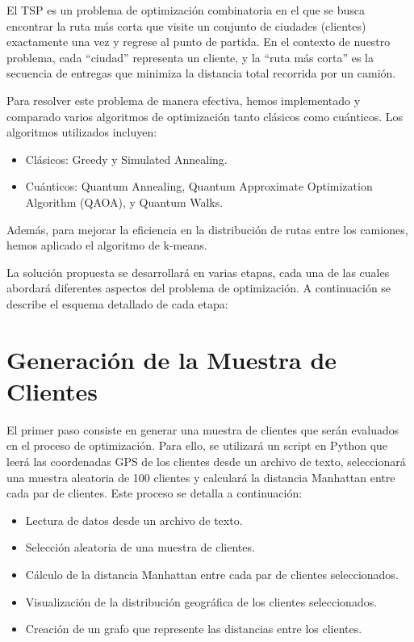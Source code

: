 \documentclass[11pt,a4paper,spanish]{book}
\begin{document}
El TSP es un problema de optimización combinatoria en el que se busca encontrar la ruta más corta que visite un conjunto de ciudades (clientes) exactamente una vez y regrese al punto de partida. En el contexto de nuestro problema, cada ``ciudad'' representa un cliente, y la ``ruta más corta'' es la secuencia de entregas que minimiza la distancia total recorrida por un camión.

Para resolver este problema de manera efectiva, hemos implementado y comparado varios algoritmos de optimización tanto clásicos como cuánticos. Los algoritmos utilizados incluyen:

\begin{itemize}
    \item Clásicos: Greedy y Simulated Annealing.
    \item Cuánticos: Quantum Annealing, Quantum Approximate Optimization Algorithm (QAOA), y Quantum Walks.
\end{itemize}

Además, para mejorar la eficiencia en la distribución de rutas entre los camiones, hemos aplicado el algoritmo de k-means.


La solución propuesta se desarrollará en varias etapas, cada una de las cuales abordará diferentes aspectos del problema de optimización. A continuación se describe el esquema detallado de cada etapa:




\section{Generación de la Muestra de Clientes}

El primer paso consiste en generar una muestra de clientes que serán evaluados en el proceso de optimización. Para ello, se utilizará un script en Python que leerá las coordenadas GPS de los clientes desde un archivo de texto, seleccionará una muestra aleatoria de 100 clientes y calculará la distancia Manhattan entre cada par de clientes. Este proceso se detalla a continuación:

\begin{itemize}
    \item Lectura de datos desde un archivo de texto.
    \item Selección aleatoria de una muestra de clientes.
    \item Cálculo de la distancia Manhattan entre cada par de clientes seleccionados.
    \item Visualización de la distribución geográfica de los clientes seleccionados.
    \item Creación de un grafo que represente las distancias entre los clientes.
\end{itemize}
\end{document}
